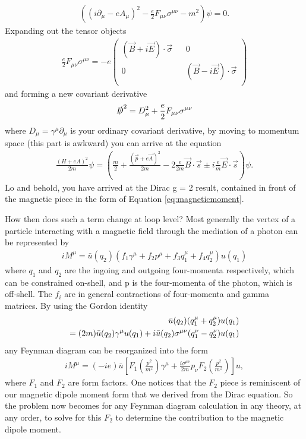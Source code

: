	\begin{align}
		((i\partial_{\mu}-eA_{\mu})^{2} - \frac{e}{2} F_{\mu\nu}\sigma^{\mu\nu} - m^{2})\psi = 0.
	\end{align}
Expanding out the tensor objects
	\begin{align}
		\frac{e}{2} F_{\mu\nu}\sigma^{\mu\nu} = -e
		\begin{pmatrix}
			(\vec{B} + i \vec{E})\cdot \vec{\sigma} && 0 \\
			0 && (\vec{B} - i \vec{E})\cdot \vec{\sigma} \\
		\end{pmatrix}
\end{align}
and forming a new covariant derivative
	\begin{align}
		\slashed{D}^{2} = D_{\mu}^{2} + \frac{e}{2} F_{\mu\nu}\sigma^{\mu\nu}
	\end{align}
where $D_{\mu} = \gamma^{\mu}\partial_{\mu}$ is your ordinary covariant derivative, by moving to momentum space (this part is awkward) you can arrive at the equation
	\begin{align}
		\frac{(H+eA)^2}{2m}\psi = (\frac{m}{2} + \frac{(\vec{p}+e\vec{A})^{2}}{2m} -2 \frac{e}{2m}\vec{B}\cdot\vec{s} \pm i \frac{e}{m}\vec{E}\cdot\vec{s})\psi.
	\end{align}
Lo and behold, you have arrived at the Dirac g = 2 result, contained in front of the magnetic piece in the form of Equation \ref{eq:magneticmoment}.

How then does such a term change at loop level? Most generally the vertex of a particle interacting with a magnetic field through the mediation of a photon can be represented by 
	\begin{align}
		iM^{\mu} = \bar{u}(q_{2}) (f_{1}\gamma^{\mu} + f_{2}p^{\mu} + f_{3}q^{\mu}_{1} + f_{4}q^{\mu}_{2}) u(q_{1})
	\end{align}
where $q_{1}$ and $q_{2}$ are the ingoing and outgoing four-momenta respectively, which can be constrained on-shell, and p is the four-momenta of the photon, which is off-shell. The $f_{i}$ are in general contractions of four-momenta and gamma matrices. By using the Gordon identity
	\begin{align}
		\bar{u}(q_{2}) (q^{\mu}_{1} + q^{\mu}_{2}) u(q_{1}) \notag \\
		= (2m)\bar{u}(q_{2}) \gamma^{\mu}u(q_{1}) + i\bar{u}(q_{2})\sigma^{\mu\nu}(q^{\nu}_{1} - q^{\nu}_{2}) u(q_{1})
	\end{align}
any Feynman diagram can be reorganized into the form 
	\begin{align}
		iM^{\mu} = (-ie)\bar{u}[F_{1}(\frac{p^{2}}{m^2})\gamma^{\mu} + \frac{i\sigma^{\mu\nu}}{2m} p_{\nu}F_{2}(\frac{p^{2}}{m^2})]u,
	\end{align}
where $F_{1}$ and $F_{2}$ are form factors. One notices that the $F_{2}$ piece is reminiscent of our magnetic dipole moment form that we derived from the Dirac equation. So the problem now becomes for any Feynman diagram calculation in any theory, at any order, to solve for this $F_{2}$ to determine the contribution to the magnetic dipole moment.
